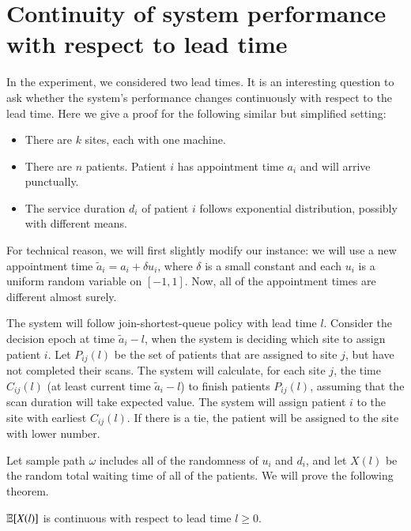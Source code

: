 \section{Continuity of system performance with respect to lead time}

In the experiment, we considered two lead times. It is an interesting question
to ask whether the system's performance changes continuously with respect to
the lead time. Here we give a proof for the following similar but simplified setting:
\begin{itemize}
\item There are $k$ sites, each with one machine.
\item There are $n$ patients. Patient $i$ has appointment time $a_i$
      and will arrive punctually.
\item The service duration $d_i$ of patient $i$ follows exponential
      distribution, possibly with different means.
\end{itemize}
For technical reason, we will first slightly modify our instance:
we will use a new appointment time $\tilde a_i = a_i + \delta u_i$,
where $\delta$ is a small constant and each $u_i$ is a uniform
random variable on $[-1,1]$. Now, all of the appointment times
are different almost surely.

The system will follow join-shortest-queue policy with lead time $l$.
Consider the decision epoch at time $\tilde a_i - l$, when the
system is deciding which site to assign patient $i$.
Let $P_{ij}(l)$ be the set of patients that are assigned to site $j$,
but have not completed their scans.
The system will calculate, for each site $j$, the time $C_{ij}(l)$
(at least current time $\tilde a_i - l$) to finish patients $P_{ij}(l)$,
assuming that the scan duration will take expected value. The system
will assign patient $i$ to the site with earliest $C_{ij}(l)$.
If there is a tie, the patient will be assigned to the site with
lower number.

Let sample path $\omega$ includes all of the randomness of $u_i$ and $d_i$,
and let $X(l)$ be the random total waiting time of all of the patients.
We will prove the following theorem.

\begin{thm}
  $\operatorname*{\mathbb{E}}[X(l)]$ is continuous with respect to lead time $l \ge 0$.
\end{thm}

